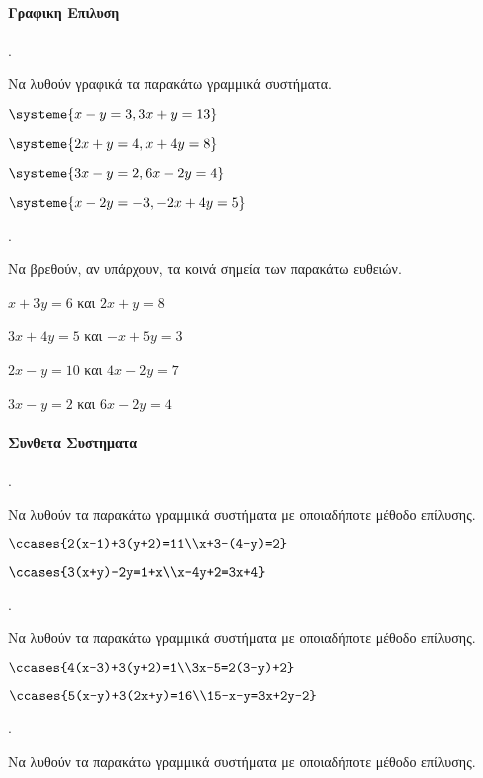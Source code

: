 \documentclass[11pt,a4paper,twocolumn]{article}
\newcounter{askhsh}
\newcommand{\askhsh}{\large\theaskhsh.\ \addtocounter{askhsh}{1}}
\begin{document}
\paragraph{Γραφικη Επιλυση}
\askhsh Να λυθούν γραφικά τα παρακάτω γραμμικά συστήματα.
\begin{multicols}{2}
\begin{alist}
\item $ \systeme{x-y=3,3x+y=13} $
\item $ \systeme{2x+y=4,x+4y=8} $
\item $ \systeme{3x-y=2,6x-2y=4} $
\item $ \systeme{x-2y=-3,-2x+4y=5} $
\end{alist}
\end{multicols}
\askhsh Να βρεθούν, αν υπάρχουν, τα κοινά σημεία των παρακάτω ευθειών.
\begin{alist}
\item $ x+3y=6 $ και $ 2x+y=8 $
\item $ 3x+4y=5 $ και $ -x+5y=3 $
\item $ 2x-y=10 $ και $ 4x-2y=7 $
\item $ 3x-y=2 $ και $ 6x-2y=4 $
\end{alist}
\paragraph{Συνθετα Συστηματα}
\askhsh Να λυθούν τα παρακάτω γραμμικά συστήματα με οποιαδήποτε μέθοδο επίλυσης.
\begin{alist}
\item $ \ccases{2(x-1)+3(y+2)=11\\x+3-(4-y)=2} $
\item $ \ccases{3(x+y)-2y=1+x\\x-4y+2=3x+4} $
\end{alist}
\askhsh Να λυθούν τα παρακάτω γραμμικά συστήματα με οποιαδήποτε μέθοδο επίλυσης.
\begin{alist}
\item $ \ccases{4(x-3)+3(y+2)=1\\3x-5=2(3-y)+2} $
\item $ \ccases{5(x-y)+3(2x+y)=16\\15-x-y=3x+2y-2} $
\end{alist}
\askhsh Να λυθούν τα παρακάτω γραμμικά συστήματα με οποιαδήποτε μέθοδο επίλυσης.
\end{document}
